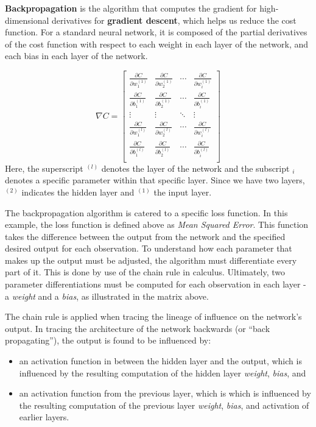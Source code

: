 \textbf{Backpropagation} is the algorithm that computes the gradient for
high-dimensional derivatives for \textbf{gradient descent}, which helps
us reduce the cost function. For a standard neural network, it is
composed of the partial derivatives of the cost function with respect to
each weight in each layer of the network, and each bias in each layer of
the network.

\[
\nabla{C} =
\begin{bmatrix}
\frac{\partial{C}}{\partial{w_1^{(1)}}} & \frac{\partial{C}}{\partial{w_2^{(1)}}} & \cdots & 
\frac{\partial{C}}{\partial{w_i^{(1)}}} \\
\frac{\partial{C}}{\partial{b_1^{(1)}}} & \frac{\partial{C}}{\partial{b_2^{(1)}}} & \cdots & 
\frac{\partial{C}}{\partial{b_i^{(1)}}} \\
\vdots & \vdots & \ddots & \vdots \\
\frac{\partial{C}}{\partial{w_1^{(l)}}} & \frac{\partial{C}}{\partial{w_2^{(l)}}} & \cdots & 
\frac{\partial{C}}{\partial{w_i^{(l)}}} \\
\frac{\partial{C}}{\partial{b_1^{(l)}}} & \frac{\partial{C}}{\partial{b_2^{(l)}}} & \cdots & 
\frac{\partial{C}}{\partial{b_i^{(l)}}} \\
\end{bmatrix}
\] Here, the superscript \(^{(l)}\) denotes the layer of the network and
the subscript \(_i\) denotes a specific parameter within that specific
layer. Since we have two layers, \(^{(2)}\) indicates the hidden layer
and \(^{(1)}\) the input layer.

The backpropagation algorithm is catered to a specific loss function. In
this example, the loss function is defined above as \emph{Mean Squared
Error}. This function takes the difference between the output from the
network and the specified desired output for each observation. To
understand how each parameter that makes up the output must be adjusted,
the algorithm must differentiate every part of it. This is done by use
of the chain rule in calculus. Ultimately, two parameter
differentiations must be computed for each observation in each layer - a
\emph{weight} and a \emph{bias}, as illustrated in the matrix above.

The chain rule is applied when tracing the lineage of influence on the
network's output. In tracing the architecture of the network backwards
(or ``back propagating''), the output is found to be influenced by:

\begin{itemize}
\tightlist
\item
  an activation function in between the hidden layer and the output,
  which is influenced by the resulting computation of the hidden layer
  \emph{weight}, \emph{bias}, and
\item
  an activation function from the previous layer, which is which is
  influenced by the resulting computation of the previous layer
  \emph{weight}, \emph{bias}, and activation of earlier layers.
\end{itemize}

